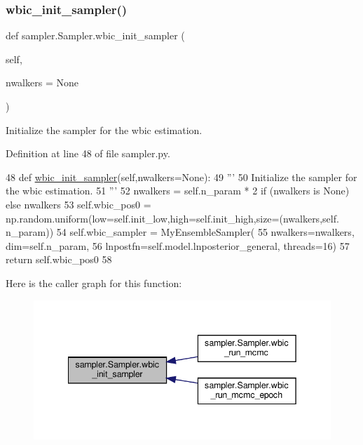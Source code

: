 \subsubsection{\texorpdfstring{wbic\+\_\+init\+\_\+sampler()}{wbic\_init\_sampler()}}
{\footnotesize\ttfamily def sampler.\+Sampler.\+wbic\+\_\+init\+\_\+sampler (\begin{DoxyParamCaption}\item[{}]{self,  }\item[{}]{nwalkers = {\ttfamily None} }\end{DoxyParamCaption})}

\begin{DoxyVerb}Initialize the sampler for the wbic estimation.
\end{DoxyVerb}
 

Definition at line 48 of file sampler.\+py.


\begin{DoxyCode}
48     \textcolor{keyword}{def }\hyperlink{classsampler_1_1Sampler_a4e540da7daf591f96268bd3090018679}{wbic\_init\_sampler}(self,nwalkers=None):
49         \textcolor{stringliteral}{'''}
50 \textcolor{stringliteral}{        Initialize the sampler for the wbic estimation.}
51 \textcolor{stringliteral}{        '''}
52         nwalkers = self.n\_param * 2 \textcolor{keywordflow}{if} (nwalkers \textcolor{keywordflow}{is} \textcolor{keywordtype}{None}) \textcolor{keywordflow}{else} nwalkers 
53         self.wbic\_pos0 = np.random.uniform(low=self.init\_low,high=self.init\_high,size=(nwalkers,self.
      n\_param))
54         self.wbic\_sampler = MyEnsembleSampler(
55             nwalkers=nwalkers, dim=self.n\_param,
56             lnpostfn=self.model.lnposterior\_general, threads=16)
57         \textcolor{keywordflow}{return} self.wbic\_pos0
58     
\end{DoxyCode}
Here is the caller graph for this function\+:\nopagebreak
\begin{figure}[H]
\begin{center}
\leavevmode
\includegraphics[width=342pt]{d3/d8a/classsampler_1_1Sampler_a4e540da7daf591f96268bd3090018679_icgraph}
\end{center}
\end{figure}
\mbox{\label{classsampler_1_1Sampler_a92faf5125f59ded708dc71303d4938ac}} 

